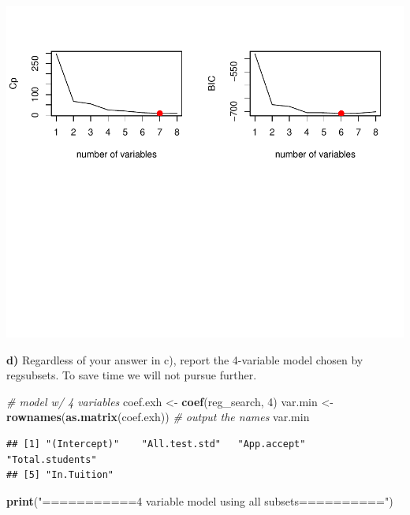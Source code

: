 \documentclass[]{article}
\newenvironment{Shaded}{\begin{snugshade}}{\end{snugshade}}
\newcommand{\KeywordTok}[1]{\textcolor[rgb]{0.13,0.29,0.53}{\textbf{#1}}}
\newcommand{\DecValTok}[1]{\textcolor[rgb]{0.00,0.00,0.81}{#1}}
\newcommand{\StringTok}[1]{\textcolor[rgb]{0.31,0.60,0.02}{#1}}
\newcommand{\CommentTok}[1]{\textcolor[rgb]{0.56,0.35,0.01}{\textit{#1}}}
\newcommand{\NormalTok}[1]{#1}
\begin{document}
\begin{flushleft}\includegraphics{Midterm_11_01_2016_Answers_files/figure-latex/unnamed-chunk-30-1} \end{flushleft}

\textbf{d)} Regardless of your answer in c), report the 4-variable model
chosen by regsubsets. To save time we will not pursue further.

\begin{Shaded}
\begin{Highlighting}[]
\CommentTok{# model w/ 4 variables}
\NormalTok{coef.exh <-}\StringTok{ }\KeywordTok{coef}\NormalTok{(reg_search, }\DecValTok{4}\NormalTok{)}
\NormalTok{var.min <-}\StringTok{ }\KeywordTok{rownames}\NormalTok{(}\KeywordTok{as.matrix}\NormalTok{(coef.exh))  }\CommentTok{# output the names}
\NormalTok{var.min}
\end{Highlighting}
\end{Shaded}

\begin{verbatim}
## [1] "(Intercept)"    "All.test.std"   "App.accept"     "Total.students"
## [5] "In.Tuition"
\end{verbatim}

\begin{Shaded}
\begin{Highlighting}[]
\KeywordTok{print}\NormalTok{(}\StringTok{"===========4 variable model using all subsets=========="}\NormalTok{)}
\end{Highlighting}
\end{Shaded}
\end{document}

